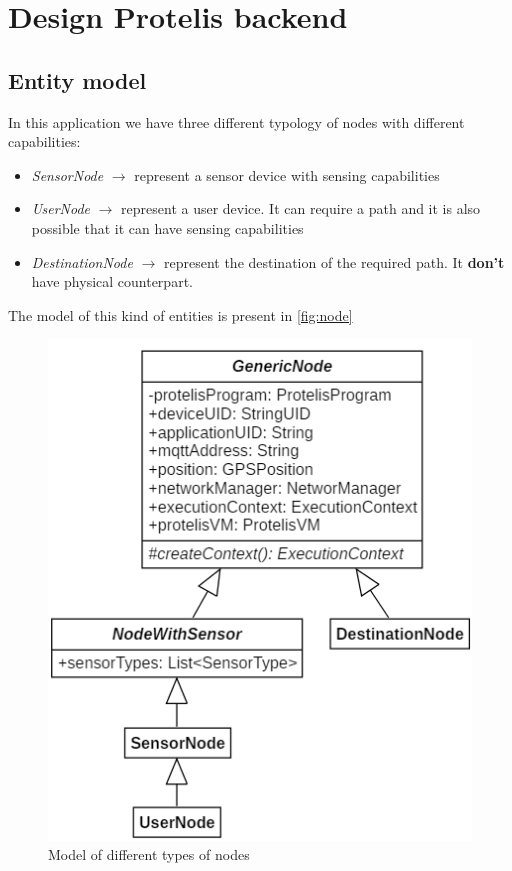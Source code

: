 \clearpage
\section{Design Protelis backend}
\subsection{Entity model}
In this application we have three different typology of nodes with different capabilities:
\begin{itemize}
    \item \textit{SensorNode} $\rightarrow$ represent a sensor device with sensing capabilities
    \item \textit{UserNode} $\rightarrow$ represent a user device. It can require a path and it is also possible that it can have sensing capabilities
    \item \textit{DestinationNode} $\rightarrow$ represent the destination of the required path. It \textbf{don't} have physical counterpart.
\end{itemize}
The model of this kind of entities is present in \autoref{fig:node}
\begin{figure}[h]
    \centering
    \includegraphics[scale=0.9]{images/nodeModel.png}
    \caption{Model of different types of nodes}
    \label{fig:node}
\end{figure}

